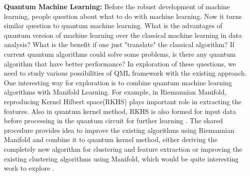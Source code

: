 \documentclass{article}
\begin{document}
\textbf{Quantum Machine Learning:}  Before the robust 
development of machine learning, people question about 
what to do with machine learning. Now it turns similar 
question to quantum machine learning. What is the advantages of 
quantum version of machine learning over the classical 
machine learning in data analysis? What is the benefit 
if one just "translate" the classical algorithm? 
If current quantum algorithms could 
solve some problems, is there any quantum algorithm that have 
better performance? In exploration of these questions, we need 
to study various possibilities of QML framework with the 
existing approach. 
One interesting way for exploration is to 
combine quantum machine learning algorithms with Manifold Learning. 
For example, in Riemannian Manifold, 
reproducing Kernel Hilbert space(RKHS)
plays important role in extracting the 
features. Also in quantum kernel method, RKHS is also 
formed for input data before processing in 
the quantum circuit for further learning \cite{qml_kernel}. 
The shared procedure provides idea to improve the existing 
algorithms using Riemannian Manifold and combine it to 
quantum kernel method, either deriving the completely new algorithm for 
clustering and feature extraction or 
improving the existing clustering algorithms using Manifold, which
would be quite interesting work to explore \cite{qml_ibm} \cite{qml_ibm2}. 
\end{document}
